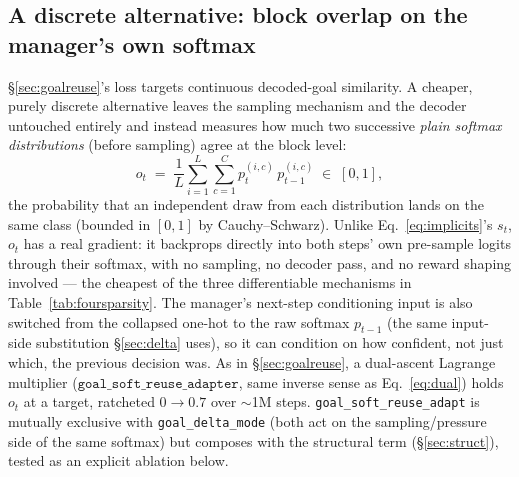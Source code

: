 \documentclass[10pt]{article}
\begin{document}
\subsection{A discrete alternative: block overlap on the manager's own softmax}
\label{sec:softreuse}

\S\ref{sec:goalreuse}'s loss targets continuous decoded-goal similarity.
A cheaper, purely discrete alternative leaves the sampling mechanism and the
decoder untouched entirely and instead measures how much two successive
\emph{plain softmax distributions} (before sampling) agree at the block
level:
\begin{equation}
o_t \;=\; \frac1L\sum_{i=1}^L \sum_{c=1}^C p_t^{(i,c)}\,p_{t-1}^{(i,c)} \;\in\; [0,1],
\label{eq:softoverlap}
\end{equation}
the probability that an independent draw from each distribution lands on
the same class (bounded in $[0,1]$ by Cauchy--Schwarz). Unlike
Eq.~\eqref{eq:implicits}'s $s_t$, $o_t$ has a real gradient: it backprops
directly into both steps' own pre-sample logits through their softmax, with
no sampling, no decoder pass, and no reward shaping involved --- the
cheapest of the three differentiable mechanisms in Table~\ref{tab:foursparsity}.
The manager's next-step conditioning input is also switched from the
collapsed one-hot to the raw softmax $p_{t-1}$ (the same input-side
substitution \S\ref{sec:delta} uses), so it can condition on how confident,
not just which, the previous decision was. As in \S\ref{sec:goalreuse}, a
dual-ascent Lagrange multiplier ($\texttt{goal\_soft\_reuse\_adapter}$, same
inverse sense as Eq.~\eqref{eq:dual}) holds $o_t$ at a target, ratcheted
$0\to0.7$ over $\sim$1M steps. \texttt{goal\_soft\_reuse\_adapt} is mutually
exclusive with \texttt{goal\_delta\_mode} (both act on the sampling/pressure
side of the same softmax) but composes with the structural term
(\S\ref{sec:struct}), tested as an explicit ablation below.
\end{document}
